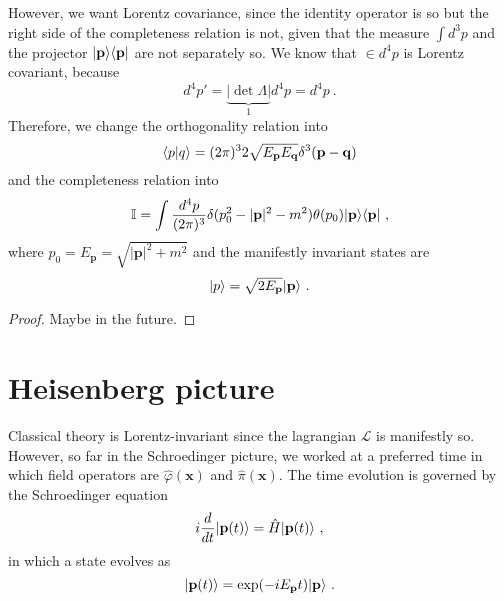     However, we want Lorentz covariance, since the identity operator is so but the right side of the completeness relation is not, given that the measure $\int d^3 p$ and the projector $\vert\mathbf p\rangle \langle\mathbf p\vert$ are not separately so. We know that $\in d^4 p$ is Lorentz covariant, because 
    \begin{equation*}
        d^4 p' = \underbrace{|\det \Lambda|}_1 d^4 p = d^4 p ~.
    \end{equation*}
    Therefore, we change the orthogonality relation into 
    \begin{equation*}
        \langle p\vert q\rangle = (2\pi)^3 2 \sqrt{E_{\mathbf p} E_{\mathbf q}} \delta^3 (\mathbf p - \mathbf q) 
    \end{equation*}
    and the completeness relation into 
    \begin{equation*}
        \mathbb I = \int \frac{d^4 p}{(2\pi)^3} \delta (p^2_0 - |\mathbf p|^2 - m^2) \theta(p_0) \vert\mathbf p\rangle \langle\mathbf p\vert ~,
    \end{equation*}
    where $p_0 = E_{\mathbf p} = \sqrt{|\mathbf p|^2 + m^2}$ and the manifestly invariant states are 
    \begin{equation}
        \vert p\rangle = \sqrt{2E_{\mathbf p}} \vert\mathbf p\rangle ~.
    \end{equation}
    \begin{proof}
        Maybe in the future.
    \end{proof}

\section{Heisenberg picture}

    Classical theory is Lorentz-invariant since the lagrangian $\mathcal L$ is manifestly so. However, so far in the Schroedinger picture, we worked at a preferred time in which field operators are $\hat \varphi (\mathbf x)$ and $\hat \pi (\mathbf x)$. The time evolution is governed by the Schroedinger equation
    \begin{equation*}
        i \frac{d}{dt} \vert\mathbf p(t)\rangle = \hat H \vert\mathbf p(t)\rangle ~,
    \end{equation*}
    in which a state evolves as 
    \begin{equation*}
        \vert\mathbf p(t)\rangle = \exp(- i E_{\mathbf p} t) \vert\mathbf p\rangle ~.
    \end{equation*}

